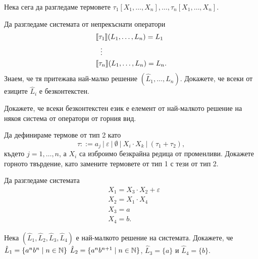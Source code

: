 Нека сега да разгледаме термовете $\tau_1[X_1,\dots,X_n], \dots, \tau_n[X_1,\dots,X_n]$.

\begin{problem}
  Да разгледаме системата от непрекъснати оператори
  \begin{align*}
    & \llbracket{\tau_1}\rrbracket(L_1,\dots,L_n) = L_1\\
    & \ \ \vdots\\
    & \llbracket{\tau_n}\rrbracket(L_1,\dots,L_n) = L_n.
  \end{align*}
  Знаем, че тя притежава най-малко решение $(\hat{L}_1,\dots,\hat{L}_n)$.
  Докажете, че всеки от езиците $\hat{L}_i$ е безконтекстен.

  Докажете, че всеки безконтекстен език е елемент от най-малкото решение 
  на някоя система от оператори от горния вид.
\end{problem}

\begin{problem}
  Да дефинираме термове от тип 2 като
  \[\tau ::= a_j\ |\ \varepsilon\ |\ \emptyset\ |\ X_i \cdot X_k\ |\ (\tau_1 + \tau_2),\]
  където $j = 1, \dots,n$, а $X_i$ са изброимо безкрайна редица от променливи.
  Докажете горното твърдение, като замените термовете от тип 1 с тези от тип 2.
\end{problem}

\begin{example}
  Да разгледаме системата
  \begin{align*}
    & X_1 = X_3 \cdot X_2 + \varepsilon\\
    & X_2 = X_1 \cdot X_4\\
    & X_3 = a\\
    & X_4 = b.
  \end{align*}


  Нека $(\hat{L}_1, \hat{L}_2, \hat{L}_3, \hat{L}_4)$ е най-малкото решение на системата.
  Докажете, че $\hat{L}_1 = \{a^nb^n\mid n \in \mathbb{N}\}$ $\hat{L}_2 = \{a^nb^{n+1}\mid n \in \mathbb{N}\}$,
  $\hat{L}_3 = \{a\}$ и $\hat{L}_4 = \{b\}$.
\end{example}

